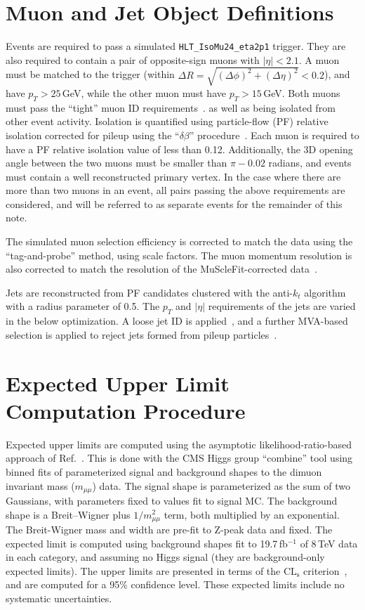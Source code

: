 \documentclass[12pt]{article}
\begin{document}
\section{Muon and Jet Object Definitions}
 
Events are required to pass a simulated \texttt{HLT\_IsoMu24\_eta2p1} trigger.
They are also required to contain a pair of opposite-sign muons with $|\eta|<2.1$.
A muon must be matched to the trigger (within $\Delta R = \sqrt{(\Delta \phi)^2+(\Delta \eta)^2}< 0.2$), 
and have $p_T>25$\,GeV, while the other muon must have $p_T>15$\,GeV.
Both muons must pass the ``tight'' muon ID requirements~\cite{AN2012_459}.
as well as being isolated from other event activity.  Isolation is quantified using
particle-flow (PF) relative isolation corrected for pileup using the ``$\delta \beta$''
procedure~\cite{AN2012_459}.  Each muon is required to have a PF relative isolation value
of less than 0.12.  Additionally, the 3D opening angle between the two muons must be
smaller than $\pi-0.02$ radians, and events must contain a well reconstructed primary
vertex.
In the case where there are more than two muons in an event, all pairs passing the above
requirements are considered, and will be referred to as separate events for the remainder
of this note.  

The simulated muon selection efficiency is corrected to match the data using 
the ``tag-and-probe'' method, using scale factors.  The muon momentum resolution
is also corrected to match the resolution of the MuScleFit-corrected data~\cite{AN2012_459}.

Jets are reconstructed from PF candidates clustered with the anti-$k_t$ algorithm with
a radius parameter of 0.5.  The $p_T$ and $|\eta|$ requirements of the jets are varied in
the below optimization.  A loose jet ID is applied~\cite{AN2012_459}, and a further
MVA-based selection is applied to reject jets formed from pileup particles~\cite{PUID}.

\section{Expected Upper Limit Computation Procedure}

Expected upper limits are computed using the asymptotic likelihood-ratio-based approach of 
Ref.~\cite{stats}.  This is done with the CMS Higgs group ``combine'' tool using binned
fits of parameterized signal and background shapes to the dimuon invariant mass 
($m_{\mu\mu}$) data.  The signal shape is parameterized
as the sum of two Gaussians, with parameters fixed to values fit to signal MC.
The background shape is a Breit--Wigner plus $1/m_{\mu\mu}^2$ term, both multiplied
by an exponential.  The Breit-Wigner mass and width are pre-fit to Z-peak data and fixed.
The expected limit is computed
using background shapes fit to 19.7\,fb$^{-1}$ of 8\,TeV data in each category,
and assuming no Higgs signal (they are background-only expected limits).  The upper
limits are presented in terms of the $\mathrm{CL_s}$ criterion~\cite{cls}, and are computed for 
a 95\% confidence level.  These expected limits include no systematic uncertainties.
\end{document}
